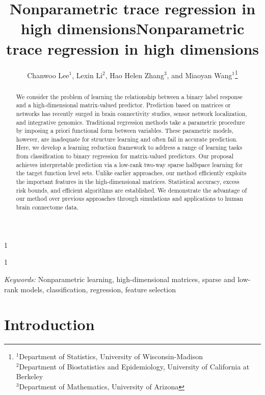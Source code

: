 \documentclass[11pt]{article}
\newcommand{\blind}{1}
\theoremstyle{plain}
\theoremstyle{definition}
\begin{document}
\blind
{   \date{}
  \title{\bf Nonparametric trace regression in high dimensions}
\author{ Chanwoo Lee$^{1}$, Lexin Li$^2$, Hao Helen Zhang$^3$, and Miaoyan Wang$^1$\footnote{
\hspace*{-.6cm}$^1$Department of Statistics, University of Wisconsin-Madison\\
$^2$Department of Biostatistics and Epidemiology, University of California at Berkeley\\
$^3$Department of Mathematics, University of Arizona}
}

    \maketitle
} \fi

\blind
{
 \date{}
  \title{\bf Nonparametric trace regression in high dimensions}
\author{}
\maketitle
} \fi

\begin{abstract}
We consider the problem of learning the relationship between a binary label response and a high-dimensional matrix-valued predictor. Prediction based on matrices or networks has recently surged in brain connectivity studies, sensor network localization, and integrative genomics. Traditional regression methods take a parametric procedure by imposing a priori functional form between variables. These parametric models, however, are inadequate for structure learning and often fail in accurate prediction. Here, we develop a learning reduction framework to address a range of learning tasks from classification to binary regression for matrix-valued predictors. Our proposal achieves interpretable prediction via a low-rank two-way sparse halfspace learning for the target function level sets. Unlike earlier approaches, our method efficiently exploits the important features in the high-dimensional matrices. Statistical accuracy, excess risk bounds, and efficient algorithms are established. We demonstrate the advantage of our method over previous approaches through simulations and applications to human brain connectome data. 

\end{abstract}
\noindent%
{\it Keywords:}  Nonparametric learning, high-dimensional matrices, sparse and low-rank models, classification, regression, feature selection

\section{Introduction}
\end{document}
